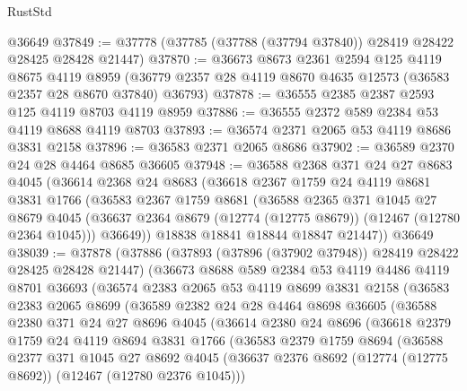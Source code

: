 \begin{lexlean}{RustStd}
\begin{coremodule}
    @36649
@37849 := @37778 (@37785 (@37788 (@37794 @37840)) @28419 @28422 @28425 @28428 @21447)
@37870 := @36673
    @8673
    @2361
    @2594
    @125
    @4119
    @8675
    @4119
    @8959
    (@36779 @2357 @28 @4119 @8670 @4635 @12573 (@36583 @2357 @28 @8670 @37840) @36793)
@37878 := @36555 @2385 @2387 @2593 @125 @4119 @8703 @4119 @8959
@37886 := @36555 @2372 @589 @2384 @53 @4119 @8688 @4119 @8703
@37893 := @36574 @2371 @2065 @53 @4119 @8686 @3831 @2158
@37896 := @36583 @2371 @2065 @8686
@37902 := @36589 @2370 @24 @28 @4464 @8685 @36605
@37948 := @36588
    @2368
    @371
    @24
    @27
    @8683
    @4045
    (@36614
      @2368
      @24
      @8683
      (@36618
        @2367
        @1759
        @24
        @4119
        @8681
        @3831
        @1766
        (@36583
          @2367
          @1759
          @8681
          (@36588
            @2365
            @371
            @1045
            @27
            @8679
            @4045
            (@36637 @2364 @8679 (@12774 (@12775 @8679)) (@12467 (@12780 @2364 @1045)))
            @36649))
        @18838
        @18841
        @18844
        @18847
        @21447))
    @36649
@38039 := @37878
    (@37886
      (@37893 (@37896 (@37902 @37948)) @28419 @28422 @28425 @28428 @21447)
      (@36673
        @8688
        @589
        @2384
        @53
        @4119
        @4486
        @4119
        @8701
        @36693
        (@36574
          @2383
          @2065
          @53
          @4119
          @8699
          @3831
          @2158
          (@36583
            @2383
            @2065
            @8699
            (@36589
              @2382
              @24
              @28
              @4464
              @8698
              @36605
              (@36588
                @2380
                @371
                @24
                @27
                @8696
                @4045
                (@36614
                  @2380
                  @24
                  @8696
                  (@36618
                    @2379
                    @1759
                    @24
                    @4119
                    @8694
                    @3831
                    @1766
                    (@36583
                      @2379
                      @1759
                      @8694
                      (@36588
                        @2377
                        @371
                        @1045
                        @27
                        @8692
                        @4045
                        (@36637 @2376 @8692 (@12774 (@12775 @8692)) (@12467 (@12780 @2376 @1045)))

\end{coremodule}
\end{lexlean}

